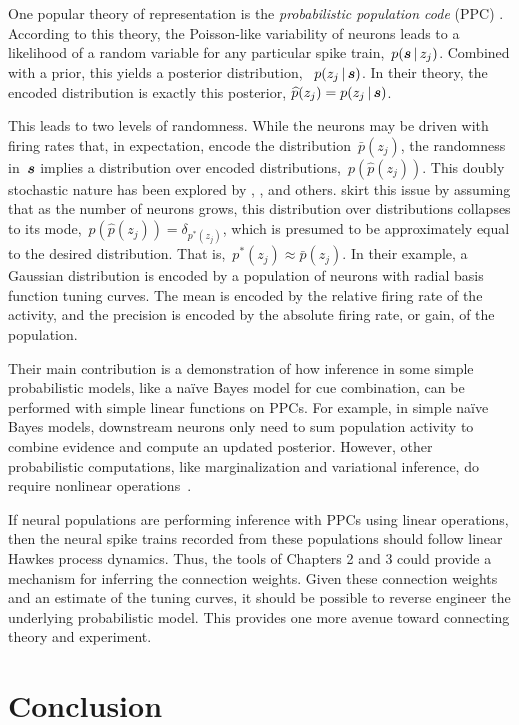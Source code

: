 One popular theory of representation is the \emph{probabilistic
  population code} (PPC) \cite{Ma2006}. According to this theory, the
Poisson-like variability of neurons leads to a likelihood of a random
variable for any particular spike train,~$p(\boldsymbol{s} \,|\, z_j)$.
Combined with a prior, this yields a posterior distribution,
~$p(z_j \,|\, \boldsymbol{s})$. In their theory, the encoded distribution is
exactly this posterior, $\widehat{p}(z_j) = p(z_j \,|\, \boldsymbol{s})$.

This leads to two levels of randomness. While
the neurons may be driven with firing rates that, in expectation,
encode the distribution~$\bar{p}(z_j)$, the randomness in~$\boldsymbol{s}$ implies
a distribution over encoded distributions,~$p(\widehat{p}(z_j))$. This doubly
stochastic nature has been explored by \citet{Zemel1998},
\citet{Sahani2003}, and others. \citet{Ma2006} skirt this issue by
assuming that as the number of neurons grows, this distribution over
distributions collapses to its mode,~$p(\widehat{p}(z_j)) = \delta_{p^*(z_j)}$,
which is presumed to be approximately equal to the desired distribution.
That is,~$p^*(z_j) \approx \bar{p}(z_j)$. In their example, a Gaussian
distribution is encoded by a population of neurons with radial
basis function tuning curves. The mean is encoded by the relative
firing rate of the activity, and the precision is encoded by the
absolute firing rate, or gain, of the population.

Their main contribution is a demonstration of how inference in some
simple probabilistic models, like a na\"ive Bayes model for cue
combination, can be performed with simple linear functions on
PPCs. For example, in simple na\"ive Bayes models, downstream neurons
only need to sum population activity to combine evidence and compute
an updated posterior. However, other probabilistic computations, like
marginalization and variational inference, do require nonlinear
operations~\cite{Beck2011, Beck2012}.

If neural populations are performing inference with PPCs using linear
operations, then the neural spike trains recorded from these
populations should follow linear Hawkes process dynamics.  Thus, the
tools of Chapters 2 and 3 could provide a mechanism for inferring the
connection weights.  Given these connection weights and an estimate of
the tuning curves, it should be possible to reverse engineer the
underlying probabilistic model. This provides one more avenue toward
connecting theory and experiment.


\section{Conclusion}
